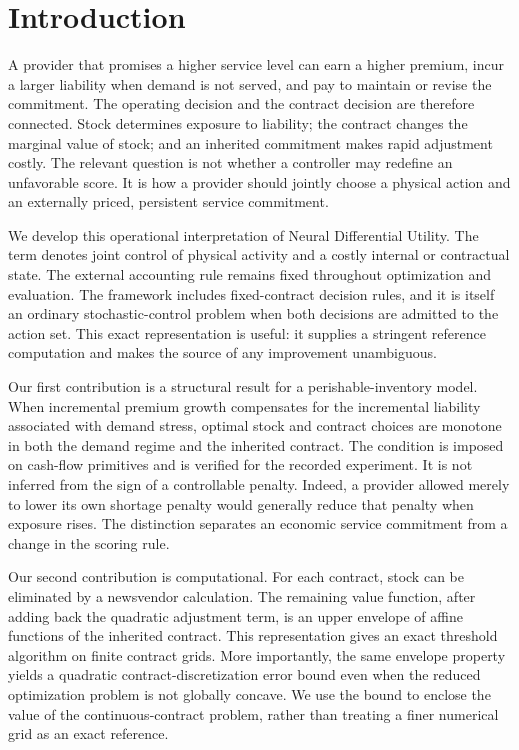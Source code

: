 \documentclass[11pt,letterpaper]{article}
\theoremstyle{definition}
\newcommand{\1}{\mathbf 1}
\begin{document}
\section{Introduction}
A provider that promises a higher service level can earn a higher premium, incur a larger liability when demand is not served, and pay to maintain or revise the commitment. The operating decision and the contract decision are therefore connected. Stock determines exposure to liability; the contract changes the marginal value of stock; and an inherited commitment makes rapid adjustment costly. The relevant question is not whether a controller may redefine an unfavorable score. It is how a provider should jointly choose a physical action and an externally priced, persistent service commitment.

We develop this operational interpretation of Neural Differential Utility. The term denotes joint control of physical activity and a costly internal or contractual state. The external accounting rule remains fixed throughout optimization and evaluation. The framework includes fixed-contract decision rules, and it is itself an ordinary stochastic-control problem when both decisions are admitted to the action set. This exact representation is useful: it supplies a stringent reference computation and makes the source of any improvement unambiguous.

Our first contribution is a structural result for a perishable-inventory model. When incremental premium growth compensates for the incremental liability associated with demand stress, optimal stock and contract choices are monotone in both the demand regime and the inherited contract. The condition is imposed on cash-flow primitives and is verified for the recorded experiment. It is not inferred from the sign of a controllable penalty. Indeed, a provider allowed merely to lower its own shortage penalty would generally reduce that penalty when exposure rises. The distinction separates an economic service commitment from a change in the scoring rule.

Our second contribution is computational. For each contract, stock can be eliminated by a newsvendor calculation. The remaining value function, after adding back the quadratic adjustment term, is an upper envelope of affine functions of the inherited contract. This representation gives an exact threshold algorithm on finite contract grids. More importantly, the same envelope property yields a quadratic contract-discretization error bound even when the reduced optimization problem is not globally concave. We use the bound to enclose the value of the continuous-contract problem, rather than treating a finer numerical grid as an exact reference.
\end{document}
